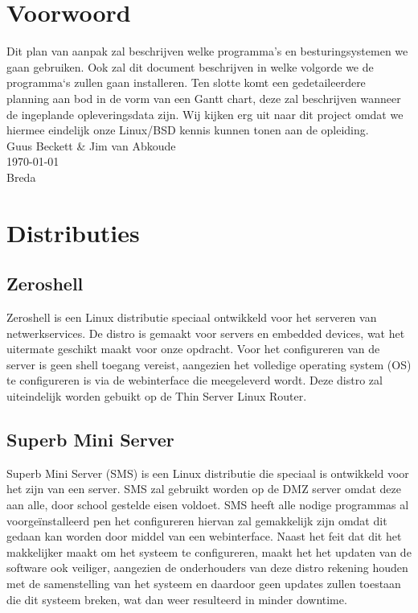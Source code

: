 \documentclass[12pt]{article}
\begin{document}
\clearpage
\section*{Voorwoord}
Dit plan van aanpak zal beschrijven welke programma's en besturingsystemen we gaan gebruiken. Ook zal dit document beschrijven in welke volgorde we de programma`s zullen gaan installeren. Ten slotte komt een gedetaileerdere planning aan bod in de vorm van een Gantt chart, deze zal beschrijven wanneer de ingeplande opleveringsdata zijn.
Wij kijken erg uit naar dit project omdat we hiermee eindelijk onze Linux/BSD kennis kunnen tonen aan de opleiding.
\\
Guus Beckett \& Jim van Abkoude \\
\today \\
Breda
\newpage
\tableofcontents
\newpage
{}
\section{Distributies}
\subsection{Zeroshell}
Zeroshell is een Linux distributie speciaal ontwikkeld voor het serveren van netwerkservices. De distro is gemaakt voor servers en embedded devices, wat het uitermate geschikt maakt voor onze opdracht. Voor het configureren van de server is geen shell toegang vereist, aangezien het volledige operating system (OS) te configureren is via de webinterface die meegeleverd wordt. Deze distro zal uiteindelijk worden gebuikt op de Thin Server Linux Router.
\subsection{Superb Mini Server}
Superb Mini Server (SMS) is een Linux distributie die speciaal is ontwikkeld voor het zijn van een server. SMS zal gebruikt worden op de DMZ server omdat deze aan alle, door school gestelde eisen voldoet. SMS heeft alle nodige programmas al voorge\"installeerd pen het configureren hiervan zal gemakkelijk zijn omdat dit gedaan kan worden door middel van een webinterface. 
Naast het feit dat dit het makkelijker maakt om het systeem te configureren, maakt het het updaten van de software ook veiliger, aangezien de onderhouders van deze distro rekening houden met de samenstelling van het systeem en daardoor geen updates zullen toestaan die dit systeem breken, wat dan weer resulteerd in minder downtime.
\end{document}
